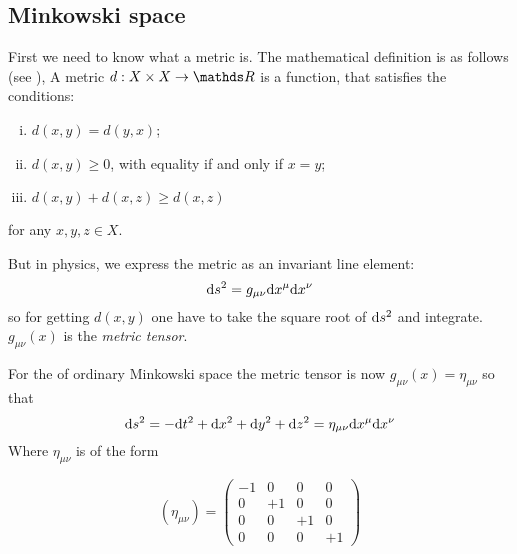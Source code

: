 \subsection{Minkowski space \checkmark}
	First we need to know what a metric is. 
	The mathematical definition is as follows (see \cite{differentialgeometrie}),
	A metric
	$ d:X\times X \rightarrow \R$ is a function, that satisfies the conditions:
		\begin{enumerate}[(i)]
			\item $d(x,y)=d(y,x)$;
			\item $d(x,y)\geq 0$, with equality if and only if $x=y$;
			\item $d(x,y)+d(x,z)\geq d(x,z)$
		\end{enumerate}
	for any $x,y,z \in X$.
	 
	But in physics, we express the metric as an invariant line element:
		\begin{equation}
		 	\mathrm{d} s^2 = g_{\mu\nu} \mathrm{d} x^\mu \mathrm{d} x^\nu
		\end{equation}
	so for getting $d(x,y)$ one have to take the square root of $\mathrm{d} s^2$ and integrate. $g_{\mu\nu}(x)$ is the \textit{metric tensor}.
	 
	 For the of ordinary Minkowski space the metric tensor is now $g_{\mu\nu}(x) = \eta_{\mu\nu}$ so that
		\begin{equation}
			\mathrm{d} s^2=- \mathrm{d} t^2 + \mathrm{d} x^2 + \mathrm{d} y^2 + \mathrm{d} z^2 = \eta_{\mu\nu} \mathrm{d} x^\mu \mathrm{d} x^\nu
		\end{equation}
	Where $\eta_{\mu\nu}$ is of the form

		\begin{equation}
		    \left(\eta_{\mu\nu}\right)=
		    \left(\begin{array}{cccc}
		    	-1 & 0 & 0 & 0\\
		    	0 & +1 & 0 & 0\\
		    	0 & 0 & +1 & 0\\
		    	0 & 0 & 0 & +1
			\end{array}\right)
		\end{equation}
	 

